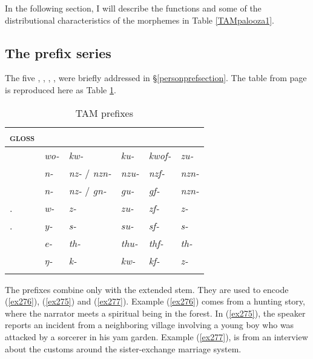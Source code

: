 In the following section, I will describe the functions and some of the distributional characteristics of the morphemes in Table \ref{TAMpalooza1}.

\subsection{The prefix series} \label{tamprefixseries}

The five  \Alph, \Bet, \Betaone, \Betatwo, \Gam{} were briefly addressed in \S{}\ref{personprefsection}. The table from page \pageref{perspref} is reproduced here as Table \ref{perspref2}.

\begin{table}[H]
\caption{TAM prefixes}
\label{perspref2}
	\begin{tabular}{llllll}
		\lsptoprule
		\textsc{gloss} &\Alph &\Bet &\Betaone &\Betatwo	&\Gam\\\hline
		\Fsg &\emph{wo-} &\emph{kw-} &\emph{ku-} &\emph{kwof-} &\emph{zu-}\\
		\Fnsg &\emph{n-} &\emph{nz-} / \emph{nzn-} &\emph{nzu-} &\emph{nzf-} &\emph{nzn-}\\
		\Ssg &\emph{n-} &\emph{nz-} / \emph{gn-} &\emph{gu-} &\emph{gf-} &\emph{nzn-}\\
		\Tsg.\F &\emph{w-} &\emph{z-} &\emph{zu-} &\emph{zf-} &\emph{z-}\\
		\Tsg.\Masc &\emph{y-} &\emph{s-} &\emph{su-} &\emph{sf-} &\emph{s-}	\\
		\Stnsg &\emph{e-} &\emph{th-} &\emph{thu-} &\emph{thf-} &\emph{th-}\\
		\M &\emph{ŋ-} &\emph{k-} &\emph{kw-} &\emph{kf-} &\emph{z-}\\
		\lspbottomrule
	\end{tabular}
\end{table}%

The \Alph{} prefixes combine only with the extended stem. They are used to encode  (\ref{ex276}),   (\ref{ex275}) and   (\ref{ex277}). Example (\ref{ex276}) comes from a hunting story, where the narrator meets a spiritual being in the forest. In (\ref{ex275}), the speaker reports an incident from a neighboring village involving a young boy who was attacked by a sorcerer in his yam garden. Example (\ref{ex277}), is from an interview about the customs around the sister-exchange marriage system.

